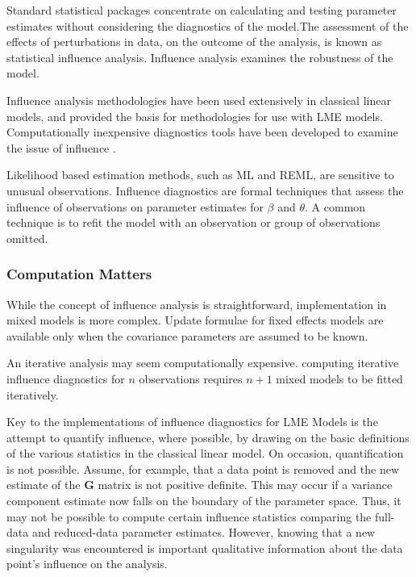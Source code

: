 \documentclass[12pt, a4paper]{report}
\theoremstyle{plain}
\theoremstyle{definition}
\theoremstyle{remark}
\begin{document}
	Standard statistical packages concentrate on calculating and testing parameter estimates without considering the diagnostics of the model.The assessment of the effects of perturbations in data, on the outcome of the analysis, is known as statistical influence analysis. Influence analysis examines the robustness of the model. 
	
	Influence analysis methodologies have been used extensively in classical linear models, and provided the basis for methodologies for use with LME models.
	Computationally inexpensive diagnostics tools have been developed to examine the issue of influence \citep{Zewotir}.
	
	
	
	
	Likelihood based estimation methods, such as ML and REML, are sensitive to unusual observations. Influence diagnostics are formal techniques that assess the influence of observations on parameter estimates for $\beta$ and $\theta$. A common technique is to refit the model with an observation or group of observations omitted.
	
	
	
	
	
	\subsubsection{Computation Matters}
	While the concept of influence analysis is straightforward, implementation in mixed models is more complex. Update formulae for fixed effects models are available only when the covariance parameters are assumed to be known.
	
	
	An iterative analysis may seem computationally expensive. computing iterative influence diagnostics for $n$ observations
	requires $n+1$ mixed models to be fitted iteratively.
	
	
	Key to the implementations of influence diagnostics for LME Models is the attempt to quantify influence, where possible, by drawing on the basic definitions of the various statistics in the classical linear	model. 
	On occasion, quantification is not possible. Assume, for example, that a data point is removed
	and the new estimate of the \textbf{G} matrix is not positive definite. This may occur if a variance component estimate now falls on the boundary of the parameter space. Thus, it may not be possible to compute certain influence statistics comparing the full-data and reduced-data parameter estimates. However, knowing that a new singularity was encountered is important qualitative information about the data point’s influence on the analysis.
	
\end{document}
